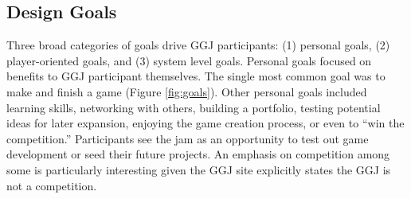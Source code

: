 \documentclass{sig-alternate}
\begin{document}

\subsection{Design Goals}
Three broad categories of goals drive GGJ participants: (1) personal goals, (2) player-oriented goals, and (3) system level goals.
Personal goals focused on benefits to GGJ participant themselves. 
The single most common goal was to make and finish a game (Figure \ref{fig:goals}). 
Other personal goals included learning skills, networking with others, building a portfolio, testing potential ideas for later expansion, enjoying the game creation process, or even to ``win the competition.'' 
Participants see the jam as an opportunity to test out game development or seed their future projects.
An emphasis on competition among some is particularly interesting given the GGJ site explicitly states the GGJ is not a competition. %
\end{document}
